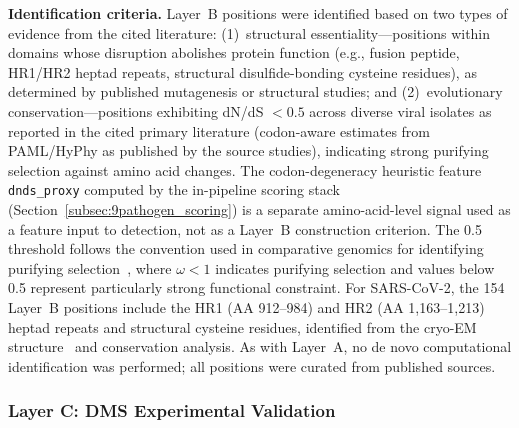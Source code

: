 \textbf{Identification criteria.}
Layer~B positions were identified based on two types of evidence from the cited literature: (1)~structural essentiality---positions within domains whose disruption abolishes protein function (e.g., fusion peptide, HR1/HR2 heptad repeats, structural disulfide-bonding cysteine residues), as determined by published mutagenesis or structural studies; and (2)~evolutionary conservation---positions exhibiting dN/dS $< 0.5$ across diverse viral isolates as reported in the cited primary literature (codon-aware estimates from PAML/HyPhy as published by the source studies), indicating strong purifying selection against amino acid changes. The codon-degeneracy heuristic feature \texttt{dnds\_proxy} computed by the in-pipeline scoring stack (Section~\ref{subsec:9pathogen_scoring}) is a separate amino-acid-level signal used as a feature input to detection, not as a Layer~B construction criterion. The 0.5 threshold follows the convention used in comparative genomics for identifying purifying selection~\cite{yang2007paml}, where $\omega < 1$ indicates purifying selection and values below 0.5 represent particularly strong functional constraint.
For SARS-CoV-2, the 154 Layer~B positions include the HR1 (AA 912--984) and HR2 (AA 1,163--1,213) heptad repeats and structural cysteine residues, identified from the cryo-EM structure~\cite{wrapp2020cryo} and conservation analysis.
As with Layer~A, no de novo computational identification was performed; all positions were curated from published sources.

\subsubsection{Layer C: DMS Experimental Validation}

